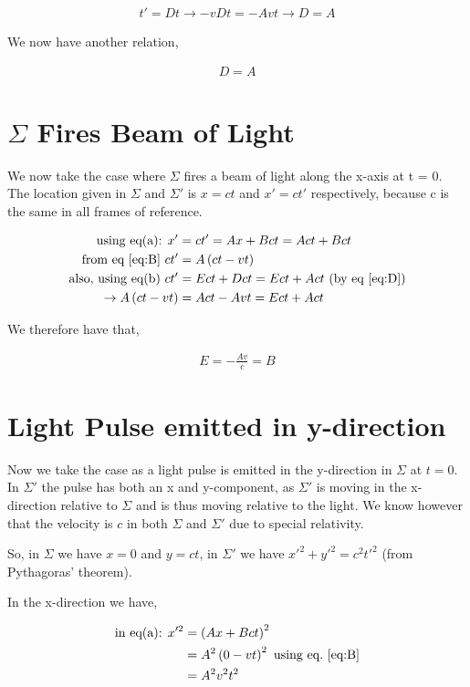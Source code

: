 \documentclass[11pt]{amsart}
\begin{document}
\begin{align*}
t' = Dt \to -vDt = -Avt \to D = A
\end{align*}

We now have another relation,

\begin{align}
\label{eq:D}
D = A
\end{align}

\section{$\Sigma$ Fires Beam of Light}

We now take the case where $\Sigma$ fires a beam of light along the x-axis at t = 0. The location given in $\Sigma$ and $\Sigma'$ is $x = ct$ and $x' = ct'$ respectively, because c is the same in all frames of reference.

\begin{align*}
\text{using eq(a):  } x' &= ct' = Ax + Bct = Act + Bct \\
\text{from eq~\ref{eq:B}  } ct' &= A\left(ct - vt\right) \\
\text{also, using eq(b)  } ct' &= Ect + Dct = Ect + Act \text{  (by eq~\ref{eq:D})} \\
\to A\left(ct - vt\right) &= Act - Avt = Ect + Act
\end{align*}

We therefore have that,

\begin{align}
\label{eq:E}
E = -\frac{Av}{c} = B
\end{align}

\section{Light Pulse emitted in y-direction}

Now we take the case as a light pulse is emitted in the y-direction in $\Sigma$ at $t = 0$. In $\Sigma'$ the pulse has both an x and y-component, as $\Sigma'$ is moving in the x-direction relative to $\Sigma$ and is thus moving relative to the light. We know however that the velocity is $c$ in both $\Sigma$ and $\Sigma'$ due to special relativity.

So, in $\Sigma$ we have $x = 0$ and $y = ct$, in $\Sigma'$ we have $x'^2 + y'^2 = c^2 t'^2$ (from Pythagoras' theorem).

In the x-direction we have,

\begin{align*}
\text{in eq(a):  } x'^2 &= \left(Ax + Bct\right)^2 \\
                        &= A^2\left(0 - vt\right)^2 \text{  using eq.~\ref{eq:B}} \\
                        &= A^2 v^2 t^2
\end{align*}
\end{document}
